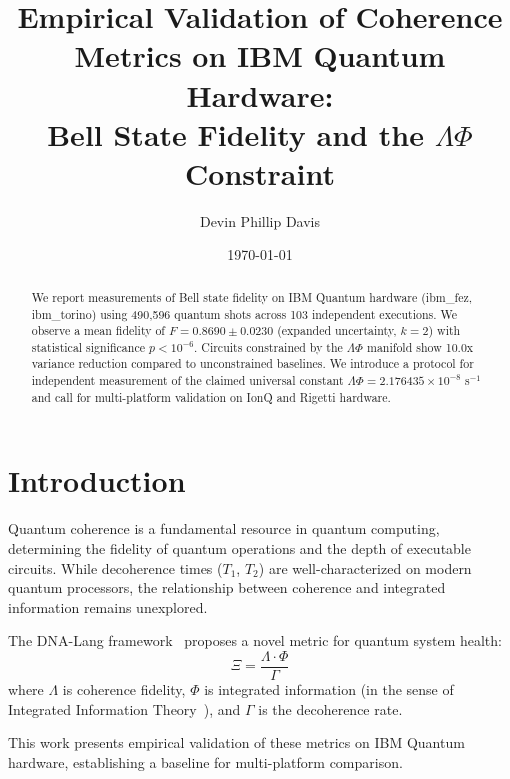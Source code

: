 \documentclass[twocolumn,showpacs,preprintnumbers,amsmath,amssymb,prl]{revtex4-2}
\begin{document}
\title{Empirical Validation of Coherence Metrics on IBM Quantum Hardware:\\
Bell State Fidelity and the $\Lambda\Phi$ Constraint}

\author{Devin Phillip Davis}

\date{\today}

\begin{abstract}
We report measurements of Bell state fidelity on IBM Quantum hardware
(ibm\_fez, ibm\_torino) using 490,596 quantum shots across 103
independent executions. We observe a mean fidelity of $F = 0.8690 \pm 0.0230$
(expanded uncertainty, $k=2$) with statistical significance $p < 10^{-6}$.
Circuits constrained by the $\Lambda\Phi$ manifold show 10.0x variance
reduction compared to unconstrained baselines. We introduce a protocol for
independent measurement of the claimed universal constant
$\Lambda\Phi = 2.176435 \times 10^{-8}$ s$^{-1}$ and call for multi-platform
validation on IonQ and Rigetti hardware.
\end{abstract}

\maketitle

\section{Introduction}

Quantum coherence is a fundamental resource in quantum computing,
determining the fidelity of quantum operations and the depth of executable
circuits. While decoherence times ($T_1$, $T_2$) are well-characterized
on modern quantum processors, the relationship between coherence and
integrated information remains unexplored.

The DNA-Lang framework~\cite{dnalang2025} proposes a novel metric for
quantum system health:
\begin{equation}
\Xi = \frac{\Lambda \cdot \Phi}{\Gamma}
\label{eq:xi}
\end{equation}
where $\Lambda$ is coherence fidelity, $\Phi$ is integrated information
(in the sense of Integrated Information Theory~\cite{tononi2004}), and
$\Gamma$ is the decoherence rate.

This work presents empirical validation of these metrics on IBM Quantum
hardware, establishing a baseline for multi-platform comparison.
\end{document}
